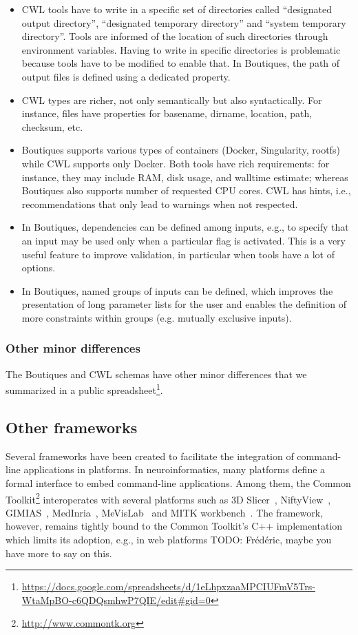 \documentclass[a4paper,num-refs]{oup-contemporary}
\newcommand{\todo}[1]{\color{red}TODO: #1\color{black}}
\newcommand{\boutiques}{Boutiques\xspace}
\begin{document}
\begin{itemize}
\item CWL tools have to write in a specific set of directories called
``designated output directory'', ``designated temporary directory''
and ``system temporary directory''. Tools are informed of the location
of such directories through environment variables. Having to write in
specific directories is problematic because tools have to be modified
to enable that. In \boutiques, the path of output files is defined
using a dedicated property.
\item CWL types are richer, not only
semantically but also syntactically. For instance, files have
properties for basename, dirname, location, path, checksum, etc.
\item \boutiques supports various types of containers (Docker, Singularity,
rootfs) while CWL supports only Docker. Both tools have rich requirements:
for instance, they may include RAM, disk usage, and walltime estimate; 
whereas \boutiques also supports number of requested CPU cores. CWL has hints, i.e.,
recommendations that only lead to warnings when not respected.
\item In \boutiques, dependencies can be defined among inputs, e.g., to
specify that an input may be used only when a particular flag is
activated. This is a very useful feature to improve validation, in
particular when tools have a lot of options.
\item In \boutiques, named
groups of inputs can be defined, which improves the presentation of
long parameter lists for the user and enables the definition of more
constraints within groups (e.g. mutually exclusive inputs).
\end{itemize}

\subsubsection{Other minor differences}

The \boutiques and CWL schemas have other minor differences that we
summarized in a public
spreadsheet\footnote{\url{https://docs.google.com/spreadsheets/d/1eLhpxzaaMPCIUFmV5Trs-WtaMpBO-c6QDQsmhwP7QIE/edit\#gid=0}}.

\subsection{Other frameworks}

Several frameworks have been created to facilitate the
integration of command-line applications in platforms. In
neuroinformatics, many platforms define a formal interface to embed
command-line applications. Among them, the Common
Toolkit\footnote{\url{http://www.commontk.org}} interoperates with
several platforms such as 3D Slicer~\cite{pieper20043d},
NiftyView~\cite{Craddock2016}, GIMIAS~\cite{larrabide2009gimias},
MedInria~\cite{larrabide2009gimias}, MeVisLab~\cite{heckel2009object}
and MITK workbench~\cite{nolden2013medical}. The framework, however,
remains tightly bound to the Common Toolkit's C++ implementation which
limits its adoption, e.g., in web platforms \todo{Fr\'ed\'eric, maybe
  you have more to say on this}.
\end{document}
